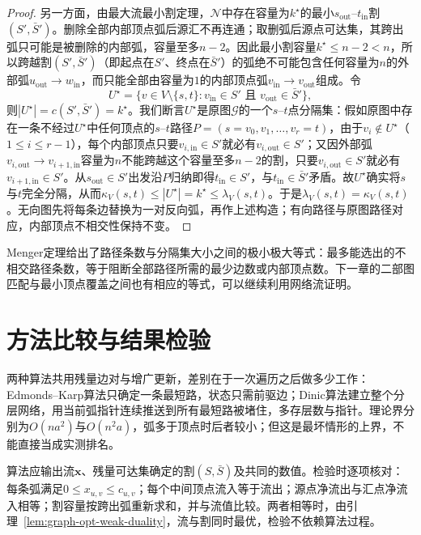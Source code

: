 \begin{proof}
另一方面，由最大流最小割定理，$\mathcal N$中存在容量为$k^\star$的最小$s_{\mathrm{out}}$--$t_{\mathrm{in}}$割$(S',\bar S')$。删除全部内部顶点弧后源汇不再连通；取删弧后源点可达集，其跨出弧只可能是被删除的内部弧，容量至多$n-2$。因此最小割容量$k^\star\leq n-2<n$，所以跨越割$(S',\bar S')$（即起点在$S'$、终点在$\bar S'$）的弧绝不可能包含任何容量为$n$的外部弧$u_{\mathrm{out}}\to w_{\mathrm{in}}$，而只能全部由容量为$1$的内部顶点弧$v_{\mathrm{in}}\to v_{\mathrm{out}}$组成。令
\[
  U^\star = \bigl\{v\in V\setminus\{s,t\} : v_{\mathrm{in}}\in S'\text{ 且 }v_{\mathrm{out}}\in\bar S'\bigr\},
\]
则$|U^\star|=c(S',\bar S')=k^\star$。我们断言$U^\star$是原图$\mathcal G$的一个$s$--$t$点分隔集：假如原图中存在一条不经过$U^\star$中任何顶点的$s$--$t$路径$P=(s=v_0,v_1,\ldots,v_r=t)$，由于$v_i\notin U^\star$（$1\leq i\leq r-1$），每个内部顶点只要$v_{i,\mathrm{in}}\in S'$就必有$v_{i,\mathrm{out}}\in S'$；又因外部弧$v_{i,\mathrm{out}}\to v_{i+1,\mathrm{in}}$容量为$n$不能跨越这个容量至多$n-2$的割，只要$v_{i,\mathrm{out}}\in S'$就必有$v_{i+1,\mathrm{in}}\in S'$。从$s_{\mathrm{out}}\in S'$出发沿$P$归纳即得$t_{\mathrm{in}}\in S'$，与$t_{\mathrm{in}}\in\bar S'$矛盾。故$U^\star$确实将$s$与$t$完全分隔，从而$\kappa_V(s,t)\leq |U^\star|=k^\star\leq\lambda_V(s,t)$。于是$\lambda_V(s,t)=\kappa_V(s,t)$。无向图先将每条边替换为一对反向弧，再作上述构造；有向路径与原图路径对应，内部顶点不相交性保持不变。
\end{proof}

Menger定理给出了路径条数与分隔集大小之间的极小极大等式：最多能选出的不相交路径条数，等于阻断全部路径所需的最少边数或内部顶点数。下一章的二部图匹配与最小顶点覆盖之间也有相应的等式，可以继续利用网络流证明。

\section{方法比较与结果检验}
\label{sec:graph-opt-max-flow-analysis}

两种算法共用残量边对与增广更新，差别在于一次遍历之后做多少工作：Edmonds--Karp算法只确定一条最短路，状态只需前驱边；Dinic算法建立整个分层网络，用当前弧指针连续推送到所有最短路被堵住，多存层数与指针。理论界分别为$O(na^2)$与$O(n^2a)$，弧多于顶点时后者较小；但这是最坏情形的上界，不能直接当成实测排名。

算法应输出流$\bm x$、残量可达集确定的割$(S,\bar S)$及共同的数值。检验时逐项核对：每条弧满足$0\leq x_{u,v}\leq c_{u,v}$；每个中间顶点流入等于流出；源点净流出与汇点净流入相等；割容量按跨出弧重新求和，并与流值比较。两者相等时，由引理~\ref{lem:graph-opt-weak-duality}，流与割同时最优，检验不依赖算法过程。

